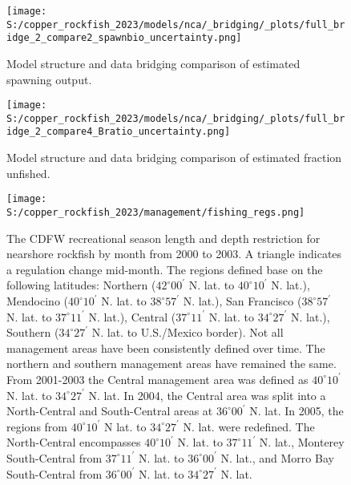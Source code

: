 \documentclass[11pt,
  letterpaper,
]{article}
\begin{document}
\pagebreak

\begin{figure}
{\centering
\texttt{[image: S:/copper\_rockfish\_2023/models/nca/\_bridging/\_plots/full\_bridge\_2\_compare2\_spawnbio\_uncertainty.png]}
}
\caption{Model structure and data bridging comparison of estimated spawning output.\label{fig:data-bridge-ssb-2}}
\end{figure}

\pagebreak

\begin{figure}
{\centering
\texttt{[image: S:/copper\_rockfish\_2023/models/nca/\_bridging/\_plots/full\_bridge\_2\_compare4\_Bratio\_uncertainty.png]}
}
\caption{Model structure and data bridging comparison of estimated fraction unfished.\label{fig:data-bridge-depl-2}}
\end{figure}

\pagebreak

\begin{figure}
{\centering
\texttt{[image: S:/copper\_rockfish\_2023/management/fishing\_regs.png]}
}
\caption{The CDFW recreational season length and depth restriction for nearshore rockfish by month from 2000 to 2003. A triangle indicates a regulation change mid-month. The regions defined base on the following latitudes: Northern ($42^\circ 00^\prime$ N. lat. to $40^\circ 10^\prime$ N. lat.), Mendocino ($40^\circ 10^\prime$ N. lat. to $38^\circ 57^\prime$ N. lat.), San Francisco ($38^\circ 57^\prime$ N. lat. to $37^\circ 11^\prime$ N. lat.), Central ($37^\circ 11^\prime$ N. lat. to $34^\circ 27^\prime$ N. lat.), Southern ($34^\circ 27^\prime$ N. lat. to U.S./Mexico border). Not all management areas have been consistently defined over time. The northern  and southern management areas have remained the same. From 2001-2003 the Central management area was defined as $40^\circ 10^\prime$ N. lat. to  $34^\circ 27^\prime$ N. lat. In 2004, the Central area was split into a North-Central and South-Central areas at $36^\circ 00^\prime$ N. lat. In 2005, the regions from $40^\circ 10^\prime$ N lat. to $34^\circ 27^\prime$ N. lat. were redefined. The North-Central encompasses $40^\circ 10^\prime$ N. lat. to $37^\circ 11^\prime$ N. lat., Monterey South-Central from $37^\circ 11^\prime$ N. lat. to $36^\circ 00^\prime$ N. lat., and Morro Bay South-Central from $36^\circ 00^\prime$ N. lat. to $34^\circ 27^\prime$ N. lat.\label{fig:depth-closures}}
\end{figure}
\end{document}
